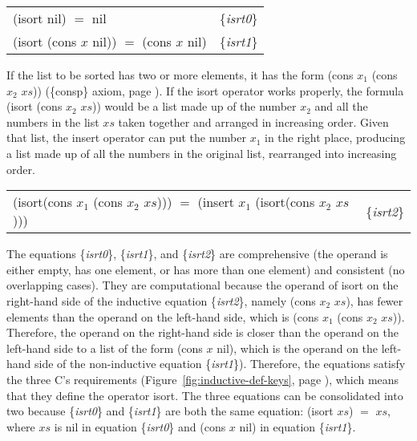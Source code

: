\begin{center}
\label{eq:isrt0}\label{eq:isrt1}
\begin{tabular}{ll}
\textsf{(isort nil) $=$ nil}                       & \{\emph{isrt0}\} \\
\textsf{(isort (cons $x$ nil)) $=$ (cons $x$ nil)} & \{\emph{isrt1}\} \\
\end{tabular}
\end{center}

If the list to be sorted has two or more elements,
it has the form \textsf{(cons $x_1$ (cons $x_2$ $xs$))}
(\{consp\} axiom, page \pageref{consp-axiom}).
If the \textsf{isort} operator works properly,
the formula \textsf{(isort (cons $x_2$ $xs$))} would be
a list made up of the number $x_2$ and all the numbers in the list $xs$
taken together and
arranged in increasing order.
Given that list, the \textsf{insert} operator can put the number $x_1$ in
the right place, producing a list made up of all the
numbers in the original list, rearranged into increasing order.

\begin{center}
\label{eq:isrt2}
\begin{tabular}{ll}
\textsf{(isort(cons $x_1$ (cons $x_2$ $xs$))) $=$ (insert $x_1$ (isort(cons $x_2$ $xs$)))} & \{\emph{isrt2}\} \\
\end{tabular}
\end{center}

The equations \{\emph{isrt0}\}, \{\emph{isrt1}\}, and \{\emph{isrt2}\}
are comprehensive (the operand is either empty, has one element, or
has more than one element) and consistent (no overlapping cases).
They are computational because the operand of \textsf{isort}
on the right-hand side of the inductive equation
\{\emph{isrt2}\}, namely \textsf{(cons $x_2$ $xs$)},
has fewer elements than the operand on the left-hand side,
which is \textsf{(cons $x_1$ (cons $x_2$ $xs$))}.
Therefore, the operand on the right-hand side is
closer than the operand on the left-hand side to a list
of the form \textsf{(cons $x$ nil)}, which is
the operand on the left-hand side of the
non-inductive equation \{\emph{isrt1}\}).
Therefore, the equations satisfy the three C's requirements
(Figure~\ref{fig:inductive-def-keys}, page \pageref{fig:inductive-def-keys}),
which means that they define the operator \textsf{isort}.
The three equations can be consolidated into two because
\{\emph{isrt0}\} and \{\emph{isrt1}\}
are both the same equation: \textsf{(isort $xs$)} $=$ $xs$,
where $xs$ is \textsf{nil} in equation \{\emph{isrt0}\}
and \textsf{(cons $x$ nil)} in equation \{\emph{isrt1}\}.

